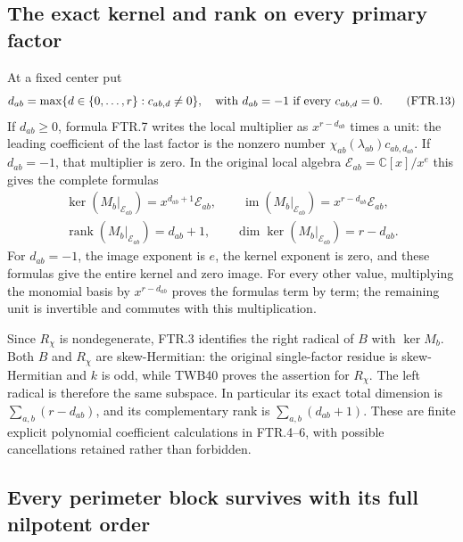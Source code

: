 \subsection{The exact kernel and rank on every primary factor}

At a fixed center put
\[
 d_{ab}=\max\{d\in\{0,\ldots,r\}:c_{ab,d}\ne0\},
 \quad\hbox{with }d_{ab}=-1\hbox{ if every }c_{ab,d}=0.
 \tag{FTR.13}
\]
If $d_{ab}\geq0$, formula FTR.7 writes the local multiplier as
$x^{r-d_{ab}}$ times a unit: the leading coefficient of the last
factor is the nonzero number
$\chi_{ab}(\lambda_{ab})c_{ab,d_{ab}}$. If $d_{ab}=-1$, that
multiplier is zero. In the original local algebra
$\mathcal E_{ab}=\mathbb C[x]/x^e$ this gives the complete formulas
\[
 \begin{gathered}
 \ker(M_b|_{\mathcal E_{ab}})=x^{d_{ab}+1}\mathcal E_{ab},\qquad
 \operatorname{im}(M_b|_{\mathcal E_{ab}})
             =x^{r-d_{ab}}\mathcal E_{ab},\\
 \operatorname{rank}(M_b|_{\mathcal E_{ab}})=d_{ab}+1,
 \qquad
 \dim\ker(M_b|_{\mathcal E_{ab}})=r-d_{ab}.
 \end{gathered}\tag{FTR.14}
\]
For $d_{ab}=-1$, the image exponent is $e$, the kernel exponent
is zero, and these formulas give the entire kernel and zero image.
For every other value, multiplying the monomial basis by
$x^{r-d_{ab}}$ proves the formulas term by term; the remaining
unit is invertible and commutes with this multiplication.

Since $R_\chi$ is nondegenerate, FTR.3 identifies the right radical
of $B$ with $\ker M_b$. Both $B$ and $R_\chi$ are skew-Hermitian:
the original single-factor residue is skew-Hermitian and $k$ is odd,
while TWB40 proves the assertion for $R_\chi$. The left radical is
therefore the same subspace. In particular its exact total dimension
is $\sum_{a,b}(r-d_{ab})$, and its complementary rank is
$\sum_{a,b}(d_{ab}+1)$. These are finite explicit polynomial
coefficient calculations in FTR.4--6, with possible cancellations
retained rather than forbidden.

\subsection{Every perimeter block survives with its full nilpotent order}

